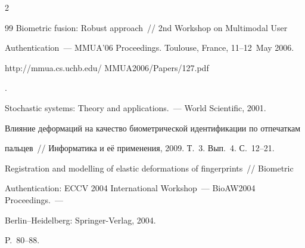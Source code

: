 \begin{multicols}{2}
{{\begin{thebibliography}{99}
Biometric fusion: Robust approach~// 2nd Workshop on Multimodal User 


Authentication~--- MMUA'06 Proceedings.  Toulouse, France, 11--12~May 2006. {\sf  


http://mmua.cs.uchb.edu/ MMUA2006/Papers/127.pdf}.









Stochastic systems: Theory and applications.~--- World Scientific, 2001.





\label{end\stat}









Влияние деформаций на качество биометрической идентификации по отпечаткам 


пальцев~// Информатика и её применения, 2009. Т.~3. Вып.~4. С.~12--21.















Registration and modelling of elastic deformations of fingerprints~// Biometric 


Authentication: ECCV 2004 International Workshop~--- BioAW2004 Proceedings.~--- 


Berlin--Heidelberg: Springer-Verlag, 2004. 


P.~80--88.


 \end{thebibliography}


}


}


\end{multicols}


